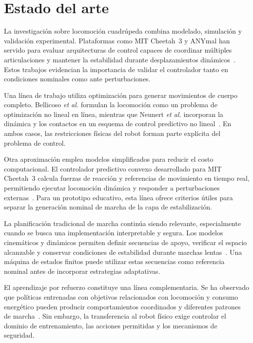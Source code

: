 \chapter{Estado del arte}

La investigación sobre locomoción cuadrúpeda combina modelado, simulación y validación experimental. Plataformas como MIT Cheetah~3 y ANYmal han servido para evaluar arquitecturas de control capaces de coordinar múltiples articulaciones y mantener la estabilidad durante desplazamientos dinámicos~\cite{bledt2018cheetah3,hutter2016anymal}. Estos trabajos evidencian la importancia de validar el controlador tanto en condiciones nominales como ante perturbaciones.

Una línea de trabajo utiliza optimización para generar movimientos de cuerpo completo. Bellicoso \textit{et al.} formulan la locomoción como un problema de optimización no lineal en línea, mientras que Neunert \textit{et al.} incorporan la dinámica y los contactos en un esquema de control predictivo no lineal~\cite{bellicoso2018dynamic,neunert2018wholebody}. En ambos casos, las restricciones físicas del robot forman parte explícita del problema de control.

Otra aproximación emplea modelos simplificados para reducir el costo computacional. El controlador predictivo convexo desarrollado para MIT Cheetah~3 calcula fuerzas de reacción y referencias de movimiento en tiempo real, permitiendo ejecutar locomoción dinámica y responder a perturbaciones externas~\cite{dicarlo2018mpc}. Para un prototipo educativo, esta línea ofrece criterios útiles para separar la generación nominal de marcha de la capa de estabilización.

La planificación tradicional de marcha continúa siendo relevante, especialmente cuando se busca una implementación interpretable y segura. Los modelos cinemáticos y dinámicos permiten definir secuencias de apoyo, verificar el espacio alcanzable y conservar condiciones de estabilidad durante marchas lentas~\cite{zamani2011dynamics}. Una máquina de estados finitos puede utilizar estas secuencias como referencia nominal antes de incorporar estrategias adaptativas.

El aprendizaje por refuerzo constituye una línea complementaria. Se ha observado que políticas entrenadas con objetivos relacionados con locomoción y consumo energético pueden producir comportamientos coordinados y diferentes patrones de marcha~\cite{heess2017emergence,fu2021energy}. Sin embargo, la transferencia al robot físico exige controlar el dominio de entrenamiento, las acciones permitidas y los mecanismos de seguridad.

